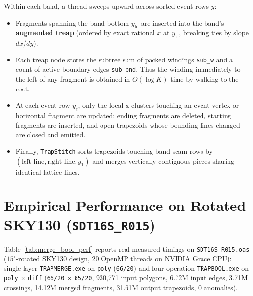 Within each band, a thread sweeps upward across sorted event rows $y$:
\begin{itemize}
  \item Fragments spanning the band bottom $y_{\text{lo}}$ are inserted into the band's \textbf{augmented treap} (ordered by exact rational $x$ at $y_{\text{lo}}$, breaking ties by slope $dx/dy$).
  \item Each treap node stores the subtree sum of packed windings \texttt{sub\_w} and a count of active boundary edges \texttt{sub\_bnd}. Thus the winding immediately to the left of any fragment is obtained in $O(\log K)$ time by walking to the root.
  \item At each event row $y_e$, only the local x-clusters touching an event vertex or horizontal fragment are updated: ending fragments are deleted, starting fragments are inserted, and open trapezoids whose bounding lines changed are closed and emitted.
  \item Finally, \texttt{TrapStitch} sorts trapezoids touching band seam rows by $(\text{left line}, \text{right line}, y_1)$ and merges vertically contiguous pieces sharing identical lattice lines.
\end{itemize}

\section{Empirical Performance on Rotated SKY130 (\texttt{SDT16S\_R015})}

Table~\ref{tab:merge_bool_perf} reports real measured timings on \texttt{SDT16S\_R015.oas} ($15^\circ$-rotated SKY130 design, 20 OpenMP threads on NVIDIA Grace CPU): single-layer \texttt{TRAPMERGE.exe} on \texttt{poly} (\texttt{66/20}) and four-operation \texttt{TRAPBOOL.exe} on \texttt{poly} $\times$ \texttt{diff} (\texttt{66/20} $\times$ \texttt{65/20}, 930,771 input polygons, 6.72M input edges, 3.71M crossings, 14.12M merged fragments, 31.61M output trapezoids, 0 anomalies).

